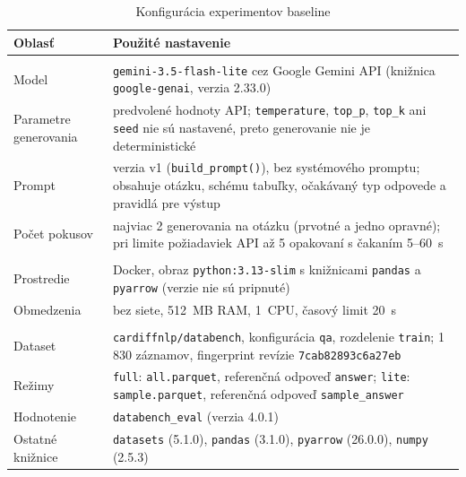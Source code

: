 \begin{table}[h]
\centering
\small
\caption{Konfigurácia experimentov baseline}
\label{tab:repro}
\renewcommand{\arraystretch}{1.25}
\begin{tabular}{@{}>{\raggedright\arraybackslash}p{4.6cm} >{\raggedright\arraybackslash}p{8.6cm}@{}}
\toprule
\textbf{Oblasť} & \textbf{Použité nastavenie} \\
\midrule

\multicolumn{2}{@{}l}{\textbf{Generovanie kódu}} \\
Model & \texttt{gemini-3.5-flash-lite} cez Google Gemini API (knižnica \texttt{google-genai}, verzia 2.33.0) \\
Parametre generovania & predvolené hodnoty API; \texttt{temperature}, \texttt{top\_p}, \texttt{top\_k} ani \texttt{seed} nie sú nastavené, preto generovanie nie je deterministické \\
Prompt & verzia v1 (\texttt{build\_prompt()}), bez systémového promptu; obsahuje otázku, schému tabuľky, očakávaný typ odpovede a pravidlá pre výstup \\
Počet pokusov & najviac 2 generovania na otázku (prvotné a jedno opravné); pri limite požiadaviek API až 5 opakovaní s čakaním 5--60~s \\

\addlinespace
\multicolumn{2}{@{}l}{\textbf{Vykonávanie kódu}} \\
Prostredie & Docker, obraz \texttt{python:3.13-slim} s knižnicami \texttt{pandas} a \texttt{pyarrow} (verzie nie sú pripnuté) \\
Obmedzenia & bez siete, 512~MB RAM, 1~CPU, časový limit 20~s \\

\addlinespace
\multicolumn{2}{@{}l}{\textbf{Dáta a vyhodnotenie}} \\
Dataset & \texttt{cardiffnlp/databench}, konfigurácia \texttt{qa}, rozdelenie \texttt{train}; 1\,830 záznamov, fingerprint revízie \texttt{7cab82893c6a27eb} \\
Režimy & \texttt{full}: \texttt{all.parquet}, referenčná odpoveď \texttt{answer}; \texttt{lite}: \texttt{sample.parquet}, referenčná odpoveď \texttt{sample\_answer} \\
Hodnotenie & \texttt{databench\_eval} (verzia 4.0.1) \\
Ostatné knižnice & \texttt{datasets} (5.1.0), \texttt{pandas} (3.1.0), \texttt{pyarrow} (26.0.0), \texttt{numpy} (2.5.3) \\

\bottomrule
\end{tabular}
\end{table}

